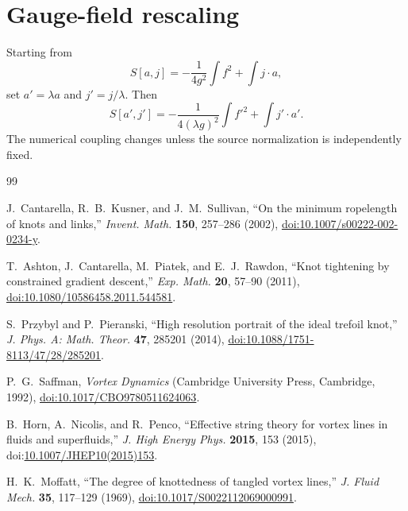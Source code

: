 \documentclass[aps,pre,preprint,notitlepage,nofootinbib,superscriptaddress]{revtex4-2}
\begin{document}
\section{Gauge-field rescaling}

Starting from
\begin{equation}
  S[a,j]=-\frac{1}{4g^2}\int f^2+\int j\cdot a,
\end{equation}
set $a'=\lambda a$ and $j'=j/\lambda$.  Then
\begin{equation}
  S[a',j']=-\frac{1}{4(\lambda g)^2}\int f'^2+\int j'\cdot a'.
\end{equation}
The numerical coupling changes unless the source normalization is independently fixed.

\begin{thebibliography}{99}

J.~Cantarella, R.~B.~Kusner, and J.~M.~Sullivan,
``On the minimum ropelength of knots and links,''
\emph{Invent. Math.} \textbf{150}, 257--286 (2002),
\href{https://doi.org/10.1007/s00222-002-0234-y}{doi:10.1007/s00222-002-0234-y}.

T.~Ashton, J.~Cantarella, M.~Piatek, and E.~J.~Rawdon,
``Knot tightening by constrained gradient descent,''
\emph{Exp. Math.} \textbf{20}, 57--90 (2011),
\href{https://doi.org/10.1080/10586458.2011.544581}{doi:10.1080/10586458.2011.544581}.

S.~Przybyl and P.~Pieranski,
``High resolution portrait of the ideal trefoil knot,''
\emph{J. Phys. A: Math. Theor.} \textbf{47}, 285201 (2014),
\href{https://doi.org/10.1088/1751-8113/47/28/285201}{doi:10.1088/1751-8113/47/28/285201}.

P.~G.~Saffman,
\emph{Vortex Dynamics}
(Cambridge University Press, Cambridge, 1992),
\href{https://doi.org/10.1017/CBO9780511624063}{doi:10.1017/CBO9780511624063}.

B.~Horn, A.~Nicolis, and R.~Penco,
``Effective string theory for vortex lines in fluids and superfluids,''
\emph{J. High Energy Phys.} \textbf{2015}, 153 (2015),
doi:\href{https://doi.org/10.1007/JHEP10(2015)153}{10.1007/JHEP10(2015)153}.

H.~K.~Moffatt,
``The degree of knottedness of tangled vortex lines,''
\emph{J. Fluid Mech.} \textbf{35}, 117--129 (1969),
\href{https://doi.org/10.1017/S0022112069000991}{doi:10.1017/S0022112069000991}.


\end{thebibliography}
\end{document}
